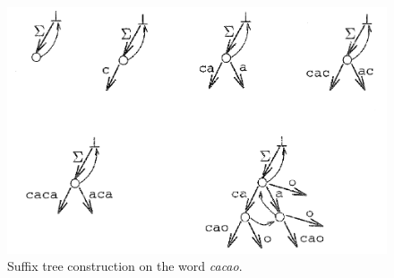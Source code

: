 
\begin{center}
	\begin{figure}
		\centering
		\includegraphics[width=0.9\linewidth]{figures/cacao}
		\caption[Suffix tree construction on the word \textit{cacao}]{Suffix tree construction on the word \textit{cacao}. \\
			}
		\label{fig:cacao}
	\end{figure}
\end{center}